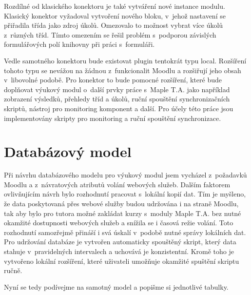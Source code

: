 \documentclass[
print,
  11pt,
  table,   
  nolof,    
  nolot,
  oneside,
  draft
]{fithesis3}
\begin{document}
Rozdílné od klasického konektoru je také vytváření nové instance modulu. Klasický konektor vyžadoval vytvoření nového bloku, v~jehož nastavení se přiřadila třída jako zdroj úkolů. Omezovalo to možnost vybrat více úkolů z~různých tříd. Tímto omezením se řešil problém s~podporou závislých formulářových polí knihovny při práci s~formuláři. 

Vedle samotného konektoru bude existovat plugin tentokrát typu local. Rozšíření tohoto typu se nevážou na žádnou z~funkcionalit Moodlu a rozšiřují jeho obsah v~libovolné podobě. Pro konektor to bude pomocné rozšíření, které bude doplňovat výukový modul o~další prvky práce s~Maple T.A. jako například zobrazení výsledků, přehledy tříd a úkolů, ruční spouštění synchronizačních skriptů, nástroj pro monitoring komponent a další. Pro účely této práce jsou implementovány skripty pro monitoring a ruční spouštění synchronizace.

	\section{Databázový model}

Při návrhu databázového modelu pro výukový modul jsem vycházel z~požadavků Moodlu a z~návratových atributů volání webových služeb. Dalším faktorem ovlivňujícím návrh bylo rozhodnutí pracovat s~lokální kopií dat. Tím je myšleno, že data poskytovaná přes webové služby budou udržována i na straně Moodlu, tak aby bylo pro tutora možné zakládat kurzy s~moduly Maple T.A. bez nutné okamžité dostupnosti webových služeb a snížila se i časová režie volání. Toto rozhodnutí samozřejmě přináší i svá úskalí v~podobě nutné správy lokálních dat. Pro udržování databáze je vytvořen automaticky spouštěný skript, který data stahuje v~pravidelných intervalech a uchovává je konzistentní. Kromě toho je vytvořeno lokální rozšíření, které uživateli umožňuje okamžité spuštění skriptu ručně.

Nyní se tedy podívejme na samotný model a popišme si jednotlivé tabulky.
\end{document}
